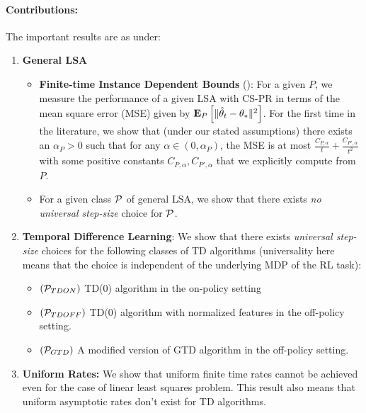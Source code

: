 \paragraph{Contributions:} The important results are as under:
\begin{enumerate}[leftmargin=*]%
\item \textbf{General LSA}
	\begin{itemize}[leftmargin=*]
\item \textbf{Finite-time Instance Dependent Bounds} (): For a given $P$, we  measure the performance of a given LSA with CS-PR in terms of the mean square error (MSE) given by $\EEP{\normsm{\thh_t-\ts}^2}$.
For the first time in the literature,
we show that (under our stated assumptions) there exists an $\alpha_P>0$ such that 
for any $\alpha\in (0,\alpha_P)$,
the MSE %
is at most $\frac{C_{P,\alpha}}{t}+\frac{C_{P',\alpha}}{t^2}$ with some positive constants $C_{P,\alpha},C_{P',\alpha}$ that we explicitly compute from $P$.
\item For a given class $\P$ of general LSA, we show that there exists \emph{no universal step-size} choice for $\P$.
\end{itemize}
\item \textbf{Temporal Difference Learning}:  We show that there exists \emph{universal step-size} choices for the following classes of TD algorithms (universality here means that the choice is independent of the underlying MDP of the RL task):
\begin{itemize}[leftmargin=*]
\item $(\P_{TDON})$ TD(0) algorithm in the on-policy setting 
\item $(\P_{TDOFF})$ TD(0) algorithm with normalized features in the off-policy setting.
\item $(\P_{GTD} )$ A modified version of GTD algorithm in the off-policy setting. \end{itemize}
\item \textbf{Uniform Rates:}  We show that uniform finite time rates cannot be achieved even for the case of linear least squares problem. This result also means that uniform asymptotic rates don't exist for TD algorithms.
\end{enumerate}

